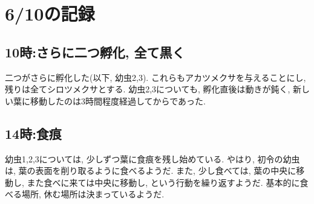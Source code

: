 \documentclass{jsarticle}
\begin{document}
\section{6/10の記録}
\subsection{10時:さらに二つ孵化, 全て黒く}
二つがさらに孵化した(以下, 幼虫2,3). これらもアカツメクサを与えることにし, 残りは全てシロツメクサとする. 
幼虫2,3についても, 孵化直後は動きが鈍く, 新しい葉に移動したのは3時間程度経過してからであった. 

\subsection{14時:食痕}
幼虫1,2,3については, 少しずつ葉に食痕を残し始めている. やはり, 初令の幼虫は, 葉の表面を削り取るように食べるようだ. 
また, 少し食べては, 葉の中央に移動し, また食べに来ては中央に移動し, という行動を繰り返すようだ. 
基本的に食べる場所, 休む場所は決まっているようだ. 
\end{document}
